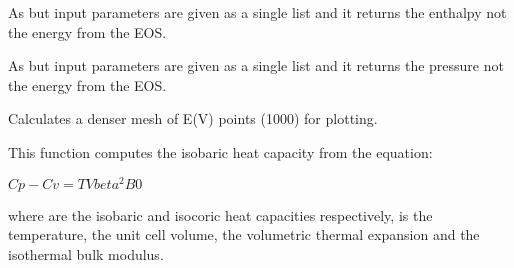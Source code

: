 \documentclass[letterpaper,10pt,english]{sphinxmanual}
\begin{document}

\begin{fulllineitems}
\label{pyqha:pyqha.eos.H_Murn}
As {\hyperref[pyqha:pyqha.eos.E_MurnV]{}} but input parameters are given as a single list 
 and it returns the enthalpy not the energy from the EOS.

\end{fulllineitems}


\begin{fulllineitems}
\label{pyqha:pyqha.eos.P_Murn}
As {\hyperref[pyqha:pyqha.eos.E_MurnV]{}} but input parameters are given as a single list 
 and it returns the pressure not the energy from the EOS.

\end{fulllineitems}


\begin{fulllineitems}
\label{pyqha:pyqha.eos.calculate_fitted_points}
Calculates a denser mesh of E(V) points (1000) for plotting.

\end{fulllineitems}


\begin{fulllineitems}
\label{pyqha:pyqha.eos.compute_Cp}
This function computes the isobaric heat capacity from the equation:

\(Cp - Cv = T V beta^2 B0\)

where  are the isobaric and isocoric heat capacities respectively,
 is the temperature,  the unit cell volume,  the volumetric
thermal expansion and  the isothermal bulk modulus.

\end{fulllineitems}
\end{document}
